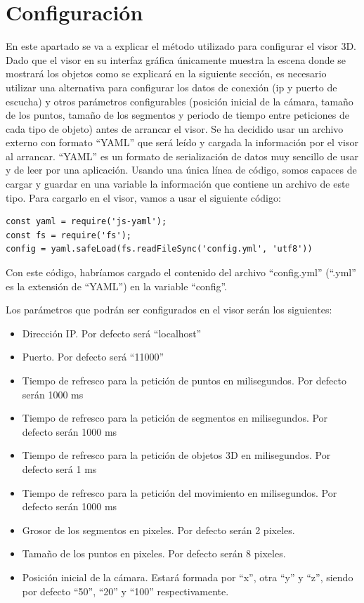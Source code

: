 \section{Configuración}
En este apartado se va a explicar el método utilizado para configurar el visor 3D. Dado que el visor en su interfaz gráfica únicamente muestra la escena donde se mostrará los objetos como se explicará en la siguiente sección, es necesario utilizar una alternativa para configurar los datos de conexión (ip y puerto de escucha) y otros parámetros configurables (posición inicial de la cámara, tamaño de los puntos, tamaño de los segmentos y periodo de tiempo entre peticiones de cada tipo de objeto) antes de arrancar el visor.
Se ha decidido usar un archivo externo con formato ``YAML'' que será leído y cargada la información por el visor al arrancar. ``YAML'' es un formato de serialización de datos muy sencillo de usar y de leer por una aplicación. Usando una única línea de código, somos capaces de cargar y guardar en una variable la información que contiene un archivo de este tipo. Para cargarlo en el visor, vamos a usar el siguiente código:
\begin{lstlisting}[frame=single]
const yaml = require('js-yaml');
const fs = require('fs');
config = yaml.safeLoad(fs.readFileSync('config.yml', 'utf8'))
\end{lstlisting}
Con este código, habríamos cargado el contenido del archivo ``config.yml'' (``.yml'' es la extensión de ``YAML'') en la variable ``config''.

Los parámetros que podrán ser configurados en el visor serán los siguientes:
\begin{itemize}
\item Dirección IP. Por defecto será ``localhost''
\item Puerto. Por defecto será ``11000''
\item Tiempo de refresco para la petición de puntos en milisegundos. Por defecto serán 1000 ms
\item Tiempo de refresco para la petición de segmentos en milisegundos. Por defecto serán 1000 ms
\item Tiempo de refresco para la petición de objetos 3D en milisegundos. Por defecto será 1 ms
\item Tiempo de refresco para la petición del movimiento en milisegundos. Por defecto serán 1000 ms
\item Grosor de los segmentos en pixeles. Por defecto serán 2 pixeles.
\item Tamaño de los puntos en pixeles. Por defecto serán 8 pixeles.
\item Posición inicial de la cámara. Estará formada por ``x'', otra ``y'' y ``z'', siendo por defecto ``50'', ``20'' y ``100'' respectivamente.
\end{itemize}

